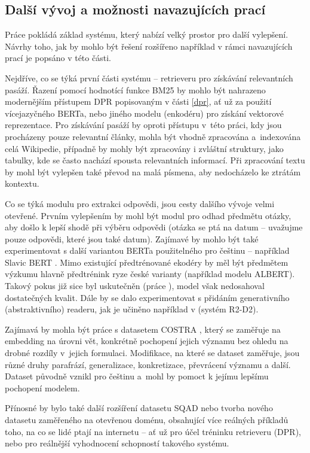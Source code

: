 \subsection{Další vývoj a možnosti navazujících prací}
Práce pokládá základ systému, který nabízí velký prostor pro další vylepšení. Návrhy toho, jak by mohlo být řešení rozšířeno například v rámci navazujících prací je popsáno v této části.\par
Nejdříve, co se týká první části systému -- retrieveru pro získávání relevantních pasáží. Řazení pomocí hodnotící funkce BM25 by mohlo být nahrazeno modernějším přístupem DPR popisovaným v části \ref{dpr}, ať už za použití vícejazyčného BERTa, nebo jiného modelu (enkodéru) pro získání vektorové reprezentace. Pro získávání pasáží by oproti přístupu v~této práci, kdy jsou procházeny pouze relevantní články, mohla být vhodně zpracována a~indexována celá Wikipedie, případně by mohly být zpracovány i zvláštní struktury, jako tabulky, kde se často nachází spousta relevantních informací. Při zpracování textu by mohl být vylepšen také převod na malá písmena, aby nedocházelo ke ztrátám kontextu.\par
Co se týká modulu pro extrakci odpovědi, jsou cesty dalšího vývoje velmi otevřené. Prvním vylepšením by mohl být modul pro odhad předmětu otázky, aby došlo k lepší shodě při výběru odpovědi (otázka se ptá na datum -- uvažujme pouze odpovědi, které jsou také datum). Zajímavé by mohlo být také experimentovat s další variantou BERTa použitelného pro češtinu -- například Slavic BERT \cite{slavicBERT}. Mimo existující předtrénované ekodéry by měl být předmětem výzkumu hlavně předtrénink ryze české varianty (například modelu ALBERT). Takový pokus již sice byl uskutečněn (práce \cite{Zelina2020thesis}), model však nedosahoval dostatečných kvalit. Dále by se dalo experimentovat s přidáním generativního (abstraktivního) readeru, jak je učiněno například v \cite{fajcik2021pruning} (systém R2-D2).\par
Zajímavá by mohla být práce s datasetem COSTRA \cite{costra}, který se zaměřuje na embedding na úrovni vět, konkrétně pochopení jejich významu bez ohledu na drobné rozdíly v~jejich formulaci. Modifikace, na které se dataset zaměřuje, jsou různé druhy parafrází, generalizace, konkretizace, převrácení významu a další. Dataset původně vznikl pro češtinu a~mohl by pomoct k jejímu lepšímu pochopení modelem.\par
Přínosné by bylo také další rozšíření datasetu SQAD nebo tvorba nového datasetu zaměřeného na otevřenou doménu, obsahující více reálných příkladů toho, na co se lidé ptají na internetu -- ať už pro účel tréninku retrieveru (DPR), nebo pro reálnější vyhodnocení schopností takového systému.

